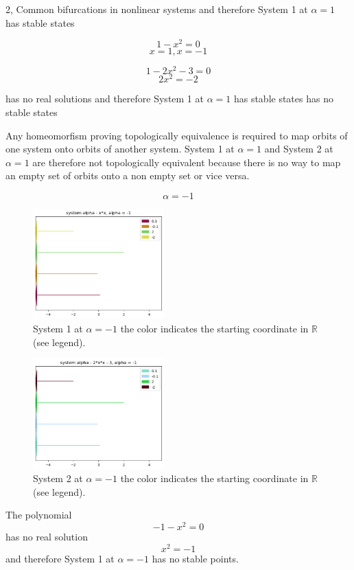 \begin{task}{2, Common bifurcations in nonlinear systems}
and therefore System 1 at $\alpha = 1$ has stable states

$$1 - x^2 = 0$$ 
$$x = 1 , x = -1$$

$$1 - 2x^2 - 3 = 0 $$ 
$$2x^2 = -2$$

has no real solutions and therefore System 1 at $\alpha = 1$ has stable states has no stable states

Any homeomorfism proving topologically equivalence is required to map orbits of one system onto orbits of another system. System 1 at $\alpha = 1$ and System 2 at $\alpha = 1$ are therefore not topologically equivalent because there is no way to map an empty set of orbits onto a non empty set or vice versa.

$$\alpha = -1$$

\begin{figure}[H]
    \centering
    \includegraphics[width=0.45\textwidth]{images/1-1.png}
    \caption{System 1 at $\alpha = -1$ the color indicates the starting coordinate in $\mathbb{R}$ (see legend).}
    \label{fig:1-1}
\end{figure}

\begin{figure}[H]
    \centering
    \includegraphics[width=0.45\textwidth]{images/2-1.png}
    \caption{System 2 at $\alpha = -1$ the color indicates the starting coordinate in $\mathbb{R}$ (see legend).}
    \label{fig:2-1}
\end{figure}

The polynomial
$$- 1 - x^2 = 0$$
has no real solution 
$$x^2 = -1$$
and therefore System 1 at $\alpha = -1$ has no stable points.


\end{task}

